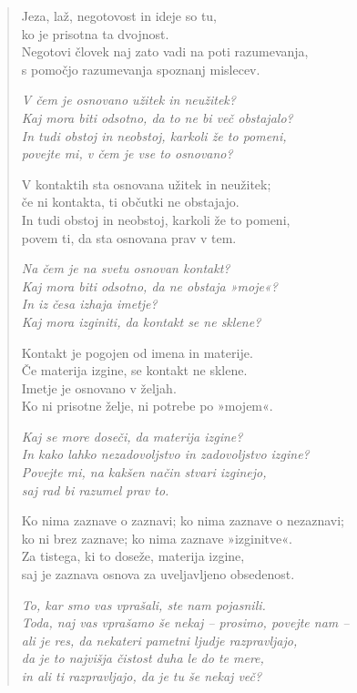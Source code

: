 \begin{verse}
Jeza, laž, negotovost in ideje so tu,\\
ko je prisotna ta dvojnost.\\
Negotovi človek naj zato vadi na poti razumevanja,\\
s pomočjo razumevanja spoznanj mislecev.

\emph{V čem je osnovano užitek in neužitek?}\\
\emph{Kaj mora biti odsotno, da to ne bi več obstajalo?}\\
\emph{In tudi obstoj in neobstoj, karkoli že to pomeni,}\\
\emph{povejte mi, v čem je vse to osnovano?}

V kontaktih sta osnovana užitek in neužitek;\\
če ni kontakta, ti občutki ne obstajajo.\\
In tudi obstoj in neobstoj, karkoli že to pomeni,\\
povem ti, da sta osnovana prav v tem.

\emph{Na čem je na svetu osnovan kontakt?\\
Kaj mora biti odsotno, da ne obstaja »moje«?}\\
\emph{In iz česa izhaja imetje?}\\
\emph{Kaj mora izginiti, da kontakt se ne sklene?}

Kontakt je pogojen od imena in materije.\\
Če materija izgine, se kontakt ne sklene.\\
Imetje je osnovano v željah.\\
Ko ni prisotne želje, ni potrebe po »mojem«.

\emph{Kaj se more doseči, da materija izgine?}\\
\emph{In kako lahko nezadovoljstvo in zadovoljstvo izgine?}\\
\emph{Povejte mi, na kakšen način stvari izginejo,}\\
\emph{saj rad bi razumel prav to.}

Ko nima zaznave o zaznavi; ko nima zaznave o nezaznavi;\\
ko ni brez zaznave; ko nima zaznave »izginitve«.\\
Za tistega, ki to doseže, materija izgine,\\
saj je zaznava osnova za uveljavljeno obsedenost.

\emph{To, kar smo vas vprašali, ste nam pojasnili.}\\
\emph{Toda, naj vas vprašamo še nekaj -- prosimo, povejte nam --}\\
\emph{ali je res, da nekateri pametni ljudje razpravljajo,}\\
\emph{da je to najvišja čistost duha le do te mere,}\\
\emph{in ali ti razpravljajo, da je tu še nekaj več?}


\end{verse}
